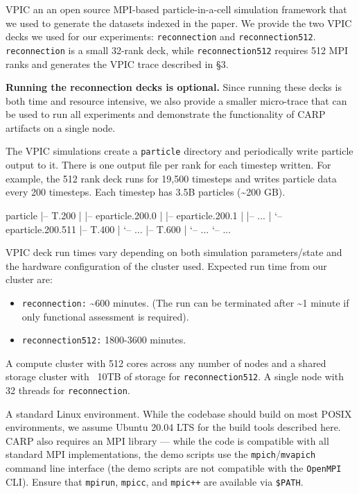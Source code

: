 \documentclass[conference]{IEEEtran}
\newenvironment{example}
{\minted[bgcolor=GhostWhite,fontsize=\small]{text}}
{\endminted}
\begin{document}
\newartifact

\artrel

VPIC an an open source MPI-based particle-in-a-cell simulation framework that
we used to generate the datasets indexed in the paper.  We provide
the two VPIC decks we used for our experiments: \texttt{reconnection}
and \texttt{reconnection512}. \texttt{reconnection} is a small 32-rank deck, while \texttt{reconnection512} requires 512 MPI ranks and generates the VPIC trace described in \S3.

\textbf{Running the reconnection decks is optional.}  Since running these decks is both time and resource intensive, we also provide a smaller micro-trace that can be used to run all experiments and demonstrate the functionality of CARP artifacts on a single node.

\artexp

The VPIC simulations create a \texttt{particle} directory and
periodically write particle output to it.  There is one output
file per rank for each timestep written.  For example, the
512 rank deck runs for 19,500 timesteps and writes particle
data every 200 timesteps.  Each timestep has 3.5B particles
(\textasciitilde200 GB).

\begin{example}
	particle
	|-- T.200
	|   |-- eparticle.200.0
	|   |-- eparticle.200.1
	|   |-- ...
	|   `-- eparticle.200.511
	|-- T.400
	|   `-- ...
	|-- T.600
	|   `-- ...
	`-- ...
\end{example}


\arttime

VPIC deck run times vary depending on both simulation parameters/state and the hardware configuration of the cluster used.   Expected run time from our cluster are:
\begin{itemize}
  \item \texttt{reconnection:} \textasciitilde600 minutes.  (The run can be terminated after \textasciitilde1 minute if only functional assessment is required).
  \item \texttt{reconnection512:} 1800-3600 minutes.
\end{itemize}

\artin

 A compute cluster with 512 cores across any number of nodes and a shared storage cluster with ~10TB of storage for \texttt{reconnection512}. A single node with 32 threads for \texttt{reconnection}.

 A standard Linux environment. While the codebase should build on most POSIX environments, we assume Ubuntu 20.04 LTS for the build tools described here. CARP also requires an MPI library --- while the code is compatible with all standard MPI implementations, the demo scripts use the \texttt{mpich}/\texttt{mvapich} command line interface (the demo scripts are not compatible with the \texttt{OpenMPI} CLI). Ensure that \texttt{mpirun}, \texttt{mpicc}, and \texttt{mpic++} are available via \texttt{\$PATH}.
\end{document}
